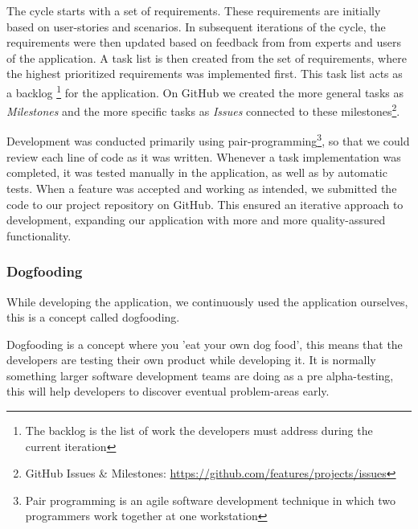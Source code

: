 The cycle starts with a set of requirements. These requirements are initially based on user-stories and scenarios. In subsequent iterations of the cycle, the requirements were then updated based on feedback from from experts and users of the application. A task list is then created from the set of requirements, where the highest prioritized requirements was implemented first. This task list acts as a backlog 
\footnote{The backlog is the list of work the developers must address during the current iteration} for the application. On GitHub we created the more general tasks as \emph{Milestones} and the more specific tasks as \emph{Issues} connected to these milestones\footnote{GitHub Issues \& Milestones: \url{https://github.com/features/projects/issues}}.

Development was conducted primarily using pair-programming\footnote{Pair programming is an agile software development technique in which two programmers work together at one workstation}, so that we could review each line of code as it was written. Whenever a task implementation was completed, it was tested manually in the application, as well as by automatic tests. When a feature was accepted and working as intended, we submitted the code to our project repository on GitHub.
This ensured an iterative approach to development, expanding our application with more and more quality-assured functionality. 

\subsubsection*{Dogfooding}
\label{dogfooding}
While developing the application, we continuously used the application ourselves, this is a concept called dogfooding.

Dogfooding is a concept where you 'eat your own dog food', this means that the developers are testing their own product while developing it\citep{dogfooding}. It is normally something larger software development teams are doing as a pre alpha-testing, this will help developers to discover eventual problem-areas early.

